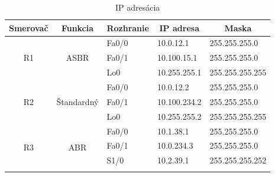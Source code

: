 \documentclass[12pt,twoside,a4paper]{report}
\begin{document}
\begin{table}[!htb]
\centering
\caption{IP adresácia}
\label{tab:ip_adresacia}
\begin{tabular}{|c|c|l|l|l|}
\hline
\multicolumn{1}{|c|}{\textbf{Smerovač}}    & \multicolumn{1}{c|}{\textbf{Funkcia}}                        & \multicolumn{1}{c|}{\textbf{Rozhranie}} & \multicolumn{1}{c|}{\textbf{IP adresa}} & \multicolumn{1}{c|}{\textbf{Maska}} \\ \hline
\multirow{3}{*}{R1}  & \multirow{3}{*}{ASBR}                   & Fa0/0                                   & 10.0.12.1                               & 255.255.255.0                       \\ \cline{3-5} 
                     &                                         & Fa0/1                                   & 10.100.15.1                             & 255.255.255.0                       \\ \cline{3-5} 
                     &                                         & Lo0                                     & 10.255.255.1                            & 255.255.255.255                     \\ \hline
\multirow{3}{*}{R2}  & \multirow{3}{*}{Štandardný}             & Fa0/0                                   & 10.0.12.2                               & 255.255.255.0                       \\ \cline{3-5} 
                     &                                         & Fa0/1                                   & 10.100.234.2                             & 255.255.255.0                       \\ \cline{3-5} 
                     &                                         & Lo0                                     & 10.255.255.2                            & 255.255.255.255                     \\ \hline
\multirow{4}{*}{R3}  & \multirow{4}{*}{ABR}                    & Fa0/0                                   & 10.1.38.1                               & 255.255.255.0                       \\ \cline{3-5} 
                     &                                         & Fa0/1                                   & 10.0.234.3                              & 255.255.255.0                       \\ \cline{3-5} 
                     &                                         & S1/0                                    & 10.2.39.1                               & 255.255.255.252                     \\ \cline{3-5} 

\end{tabular}
\end{table}
\end{document}
